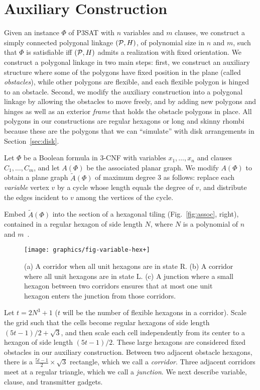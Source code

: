\section{Auxiliary Construction\label{sec:auxiliaryConstruction}}
Given an instance $\Phi$ of P3SAT with $n$ variables and $m$ clauses, we construct a simply connected polygonal linkage $({\cal P},H)$, of polynomial size in $n$ and $m$, such that $\Phi$ is satisfiable iff $({\cal P},H)$ admits a realization with fixed orientation. 
We construct a polygonal linkage  in two main steps: first, we construct an auxiliary structure where some of the polygons have fixed position in the plane (called \emph{obstacles}), while other polygons are flexible, and each flexible polygon is hinged to an obstacle. 
Second, we modify the auxiliary construction into a polygonal linkage by allowing the obstacles to move freely, and by adding new polygons and hinges as well as an exterior \emph{frame} that holds the obstacle polygons in place.
All polygons in our constructions are regular hexagons or long and skinny rhombi because these are the polygons that we can ``simulate'' with disk arrangements in Section~\ref{sec:disk}.

Let $\Phi$ be a Boolean formula in 3-CNF with variables $x_1,\ldots , x_n$ and clauses $C_1,\ldots ,C_m$, and let $A(\Phi)$ be the associated planar graph.
We modify $A(\Phi)$ to obtain a plane graph $\tilde{A}(\Phi)$ of maximum degree 3 as follows: replace each \emph{variable} vertex $v$ by a cycle whose length equals the degree of $v$, and distribute the edges incident to $v$ among the vertices of the cycle.

Embed $\tilde{A}(\Phi)$ into the section of a hexagonal tiling (Fig.~\ref{fig:assoc}, right), contained in a regular hexagon of side length $N$, where $N$ is a polynomial of $n$ and $m$~\cite{BK+98}.
\begin{figure}[htbp]
	\centering
	\texttt{[image: graphics/fig-variable-hex+]}
	\caption{(a) A corridor when all unit hexagons are in state R.
(b) A corridor where all unit hexagons are in state L.
(c) A junction where a small hexagon between two corridors
    ensures that at most one unit hexagon enters the junction from those corridors.}
	\label{fig:variable}
\end{figure}
Let $t=2N^3+1$ ($t$ will be the number of flexible hexagons in a corridor). Scale the grid such that the cells become regular hexagons of side length $(5t-1)/2+\sqrt{3}$, and then scale each cell independently from its center to a hexagon of side length $(5t-1)/2$. These large hexagons are considered fixed obstacles in our auxiliary construction. Between two adjacent obstacle hexagons, there is a $\frac{5t-1}{2}\times \sqrt{3}$ rectangle, which we call a \emph{corridor}. Three adjacent corridors meet at a regular triangle, which we call a \emph{junction}. We next describe variable, clause, and transmitter gadgets.

